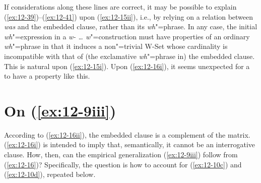 \documentclass[output=paper]{langsci/langscibook}
\begin{document}
If considerations along these lines are correct, it may be possible to
explain (\ref{ex:12-39})--(\ref{ex:12-41}) upon (\ref{ex:12-15ii}), i.e., by relying on a relation
between \textit{was} and the embedded clause, rather than its \emph{wh}"=phrase. In any case, the initial \emph{wh}"=expression in a \textit{w- \ldots{} w}"=construction must have properties of an ordinary \emph{wh}"=phrase in that it induces a non"=trivial W-Set whose cardinality is incompatible with that of (the exclamative \emph{wh}"=phrase in) the embedded clause.
This is natural upon (\ref{ex:12-15i}). Upon (\ref{ex:12-16i}), it seems unexpected for a
 to have a property like this.

\section{On (\ref{ex:12-9iii})}
\label{sec:12-10}

According to (\ref{ex:12-16ii}), the embedded clause is a complement of the
matrix. (\ref{ex:12-16i}) is intended to imply that, semantically, it cannot be an
interrogative clause. How, then, can the empirical generalization
(\ref{ex:12-9iii}) follow from (\ref{ex:12-16})? Specifically, the question is how
to account for (\ref{ex:12-10c}) and (\ref{ex:12-10d}), repeated below.
\end{document}
